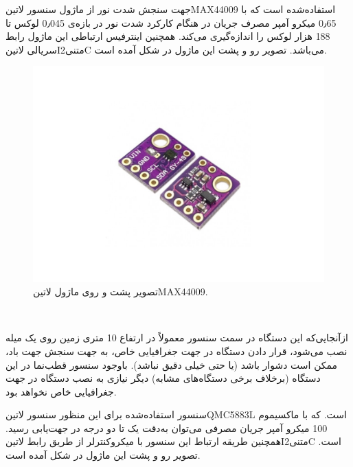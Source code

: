 جهت سنجش شدت نور از ماژول سنسور ‌لاتین{MAX44009} استفاده‌شده است که با 0٫65 میکرو آمپر مصرف جریان در هنگام کارکرد شدت نور در بازه‌ی 0٫045 لوکس تا 188 هزار لوکس را اندازه‌گیری می‌کند. همچنین اینترفیس ارتباطی این ماژول رابط سریالی ‌لاتین{I‌متنی{2}C} می‌باشد. تصویر رو و پشت این ماژول در شکل  آمده است.

\begin{figure}[H]
	\centering
	\includegraphics[width=0.8\linewidth]{Assets/MAX44009.jpg}
	\caption{تصویر پشت و روی ماژول ‌لاتین{MAX44009}.}
	\label{fig:MAX44009}
\end{figure}

‌

ازآنجایی‌که این دستگاه در سمت سنسور معمولاً در ارتفاع 10 متری زمین روی یک میله نصب می‌شود، قرار دادن دستگاه در جهت جغرافیایی خاص، به جهت سنجش جهت باد، ممکن است دشوار باشد (یا حتی خیلی دقیق نباشد). باوجود سنسور قطب‌نما در این دستگاه (برخلاف برخی دستگاه‌های مشابه) دیگر نیازی به نصب دستگاه در جهت جغرافیایی خاص نخواهد بود.

سنسور استفاده‌شده برای این منظور سنسور ‌لاتین{QMC5883L} است. که با ماکسیموم 100 میکرو آمپر جریان مصرفی می‌توان به‌دقت یک تا دو درجه در جهت‌یابی رسید. همچنین طریقه ارتباط این سنسور با میکروکنترلر از طریق رابط ‌لاتین{I‌متنی{2}C} است. تصویر رو و پشت این ماژول در شکل  آمده است.

